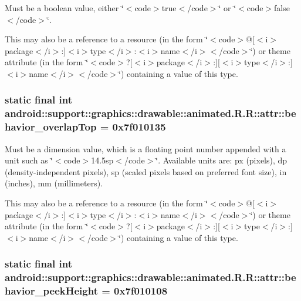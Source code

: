 Must be a boolean value, either \char`\"{}$<$code$>$true$<$/code$>$\char`\"{} or \char`\"{}$<$code$>$false$<$/code$>$\char`\"{}. 

This may also be a reference to a resource (in the form \char`\"{}$<$code$>$@\mbox{[}$<$i$>$package$<$/i$>$:\mbox{]}$<$i$>$type$<$/i$>$:$<$i$>$name$<$/i$>$$<$/code$>$\char`\"{}) or theme attribute (in the form \char`\"{}$<$code$>$?\mbox{[}$<$i$>$package$<$/i$>$:\mbox{]}\mbox{[}$<$i$>$type$<$/i$>$:\mbox{]}$<$i$>$name$<$/i$>$$<$/code$>$\char`\"{}) containing a value of this type. \hypertarget{classandroid_1_1support_1_1graphics_1_1drawable_1_1animated_1_1_r_1_1attr_6146f207eb774989bd83b94367b72c32}{
\subsubsection[{behavior\_\-overlapTop}]{\setlength{\rightskip}{0pt plus 5cm}static final int android::support::graphics::drawable::animated.R.R::attr::behavior\_\-overlapTop = 0x7f010135}}
\label{classandroid_1_1support_1_1graphics_1_1drawable_1_1animated_1_1_r_1_1attr_6146f207eb774989bd83b94367b72c32}


Must be a dimension value, which is a floating point number appended with a unit such as \char`\"{}$<$code$>$14.5sp$<$/code$>$\char`\"{}. Available units are: px (pixels), dp (density-independent pixels), sp (scaled pixels based on preferred font size), in (inches), mm (millimeters). 

This may also be a reference to a resource (in the form \char`\"{}$<$code$>$@\mbox{[}$<$i$>$package$<$/i$>$:\mbox{]}$<$i$>$type$<$/i$>$:$<$i$>$name$<$/i$>$$<$/code$>$\char`\"{}) or theme attribute (in the form \char`\"{}$<$code$>$?\mbox{[}$<$i$>$package$<$/i$>$:\mbox{]}\mbox{[}$<$i$>$type$<$/i$>$:\mbox{]}$<$i$>$name$<$/i$>$$<$/code$>$\char`\"{}) containing a value of this type. \hypertarget{classandroid_1_1support_1_1graphics_1_1drawable_1_1animated_1_1_r_1_1attr_0d06a0a44157ac3e36911e1a996264ab}{
\subsubsection[{behavior\_\-peekHeight}]{\setlength{\rightskip}{0pt plus 5cm}static final int android::support::graphics::drawable::animated.R.R::attr::behavior\_\-peekHeight = 0x7f010108}}
\label{classandroid_1_1support_1_1graphics_1_1drawable_1_1animated_1_1_r_1_1attr_0d06a0a44157ac3e36911e1a996264ab}


